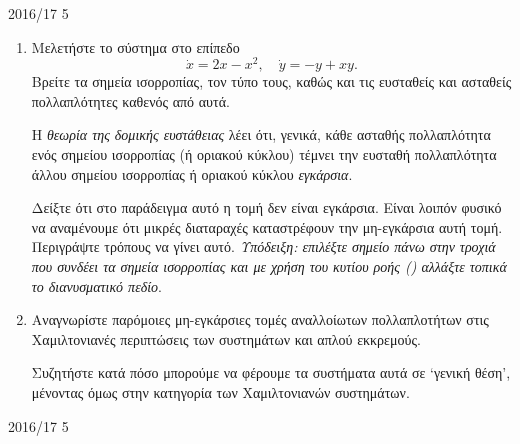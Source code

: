\begin{exercise}{2016/17 5}
    \begin{enumerate}[label= (\alph*)]
        \item Μελετήστε το σύστημα στο επίπεδο
            \[
                \dot{x} = 2x - x^2, \quad \dot{y} = -y + xy.
            \]
            Βρείτε τα σημεία ισορροπίας, τον τύπο τους, καθώς και τις ευσταθείς
            και ασταθείς πολλαπλότητες καθενός από αυτά.

            Η \emph{θεωρία της δομικής ευστάθειας} λέει ότι, γενικά, κάθε ασταθής
            πολλαπλότητα ενός σημείου ισορροπίας (ή οριακού κύκλου) τέμνει την
            ευσταθή πολλαπλότητα άλλου σημείου ισορροπίας ή οριακού κύκλου
            \emph{εγκάρσια}.

            Δείξτε ότι στο παράδειγμα αυτό η τομή δεν είναι εγκάρσια. Είναι
            λοιπόν φυσικό να αναμένουμε ότι μικρές διαταραχές καταστρέφουν την
            μη-εγκάρσια αυτή τομή. Περιγράψτε τρόπους να γίνει αυτό.
            \emph{Υπόδειξη: επιλέξτε σημείο πάνω στην τροχιά που συνδέει τα
                σημεία ισορροπίας και με χρήση του κυτίου ροής ()
            αλλάξτε τοπικά το διανυσματικό πεδίο}.
        \item Αναγνωρίστε παρόμοιες μη-εγκάρσιες τομές αναλλοίωτων πολλαπλοτήτων
            στις Χαμιλτονιανές περιπτώσεις των συστημάτων  και απλού
            εκκρεμούς.

            Συζητήστε κατά πόσο μπορούμε να φέρουμε τα συστήματα αυτά σε
            \enquote*{γενική θέση}, μένοντας όμως στην κατηγορία των
            Χαμιλτονιανών συστημάτων.
    \end{enumerate}
\end{exercise}
\begin{solution}{2016/17 5}

\end{solution}
